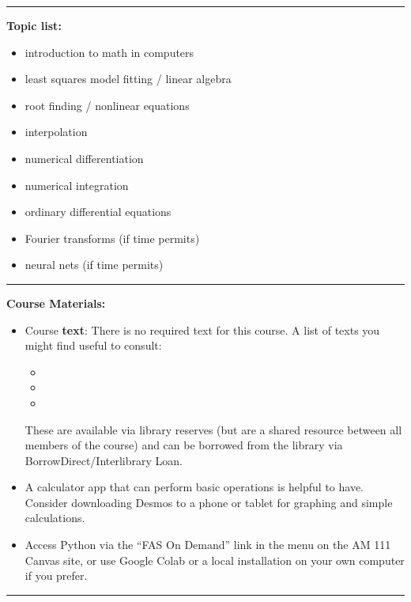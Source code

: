 \documentclass[12pt,letterpaper]{exam}
\begin{document}
\vspace{0.5cm}
\hrule
\vspace{0.5cm}

\noindent\textbf{Topic list:} 
\begin{itemize}
\itemsep0pt
    \item introduction to math in computers
    \item least squares model fitting / linear algebra
    \item root finding / nonlinear equations
    \item interpolation
    \item numerical differentiation
    \item numerical integration
    \item ordinary differential equations
    \item Fourier transforms (if time permits)
    \item neural nets (if time permits)
\end{itemize}


\hrule
\vspace{0.5cm}

\noindent\textbf{Course Materials:} 
\begin{itemize}
\setlength\itemsep{0.08em}
\item Course \textbf{text}: There is no required text for this course.  A list of texts you might find useful to consult:
\begin{itemize}
\itemsep0pt
    \item {}
    \item {}
    \item {}
\end{itemize}

These are available via library reserves (but are a shared resource between all members of the course) and can be borrowed from the library via BorrowDirect/Interlibrary Loan.

\item A calculator app that can perform basic operations is helpful to have.  Consider downloading Desmos to a phone or tablet for graphing and simple calculations.

\item Access Python via the ``FAS On Demand'' link in the menu on the AM 111 Canvas site, or use Google Colab or a local installation on your own computer if you prefer.
\end{itemize}
\hrule
\vspace{0.5cm}
\end{document}
